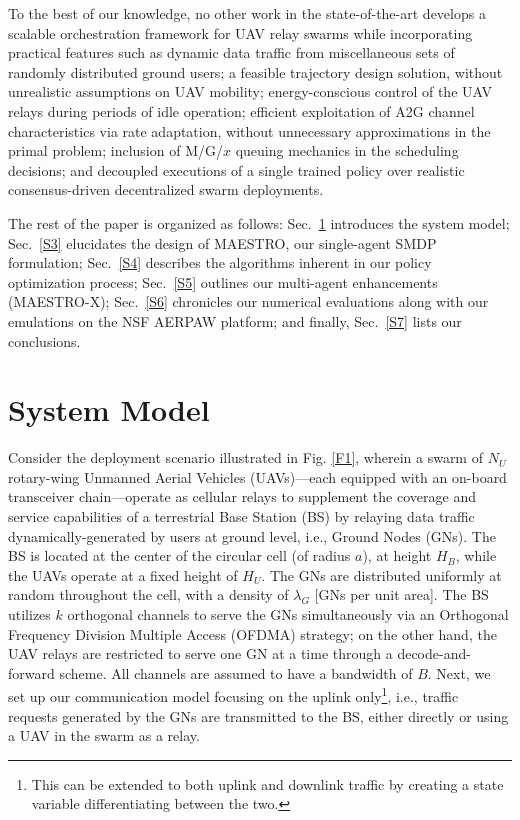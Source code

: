\documentclass[12pt, draftcls, onecolumn]{IEEEtran}
\theoremstyle{plain}
\theoremstyle{definition}
\theoremstyle{remark}
\begin{document}
To the best of our knowledge, no other work in the state-of-the-art develops a scalable orchestration framework for UAV relay swarms while incorporating practical features such as dynamic data traffic from miscellaneous sets of randomly distributed ground users; a feasible trajectory design solution, without unrealistic assumptions on UAV mobility; energy-conscious control of the UAV relays during periods of idle operation; efficient exploitation of A2G channel characteristics via rate adaptation, without unnecessary approximations in the primal problem; inclusion of M/G/$x$ queuing mechanics in the scheduling decisions; and decoupled executions of a single trained policy over realistic consensus-driven decentralized swarm deployments.

The rest of the paper is organized as follows: Sec.~\ref{S2} introduces the system model; Sec.~\ref{S3} elucidates the design of MAESTRO, our single-agent SMDP formulation; Sec.~\ref{S4} describes the algorithms inherent in our policy optimization process; Sec.~\ref{S5} outlines our multi-agent enhancements (MAESTRO-X); Sec.~\ref{S6} chronicles our numerical evaluations along with our emulations on the NSF AERPAW platform; and finally, Sec.~\ref{S7} lists our conclusions.
\vspace{-4mm}


\section{System Model}\label{S2}
\vspace{-2mm}

Consider the deployment scenario illustrated in Fig. \ref{F1}, wherein a swarm of $N_{U}$ rotary-wing Unmanned Aerial Vehicles (UAVs)---each equipped with an on-board transceiver chain---operate as cellular relays to supplement the coverage and service capabilities of a terrestrial Base Station (BS) by relaying data traffic dynamically-generated by users at ground level, i.e., Ground Nodes (GNs). The BS is located at the center of the circular cell (of radius $a$), at height $H_{B}$, while the UAVs operate at a fixed height of $H_{U}$. The GNs are distributed uniformly at random throughout the cell, with a density of $\lambda_{G}$ [GNs per unit area]. The BS utilizes $k$ orthogonal channels to serve the GNs simultaneously via an Orthogonal Frequency Division Multiple Access (OFDMA) strategy; on the other hand, the UAV relays are restricted to serve one GN at a time through a decode-and-forward scheme. All channels are assumed to have a bandwidth of $B$. Next, we set up our communication model focusing on the uplink only\footnote{This can be extended to both uplink and downlink traffic by creating a state variable differentiating between the two.}, i.e., traffic requests generated by the GNs are transmitted to the BS, either directly or using a UAV in the swarm as a relay.
\end{document}
